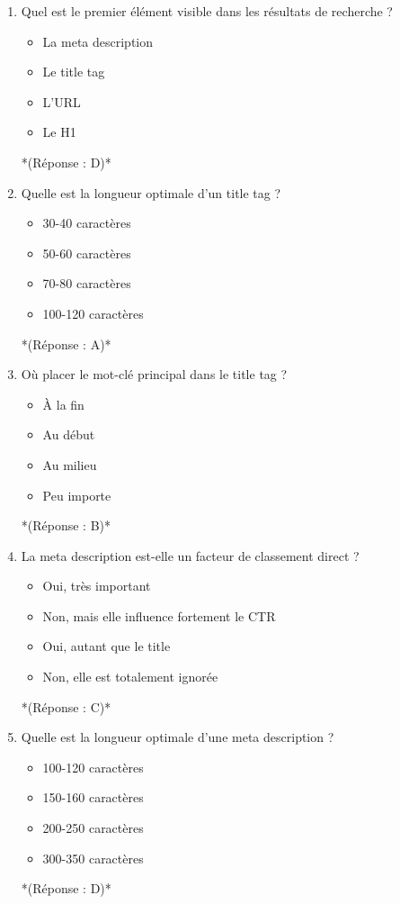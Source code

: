 \documentclass[12pt,a4paper,twoside]{report}
\begin{document}
\begin{enumerate}
\item Quel est le premier élément visible dans les résultats de recherche ?
\begin{itemize}
\item[A)] La meta description
\item[B)] Le title tag
\item[C)] L'URL
\item[D)] Le H1
\end{itemize}
*(Réponse : D)*

\item Quelle est la longueur optimale d'un title tag ?
\begin{itemize}
\item[A)] 30-40 caractères
\item[B)] 50-60 caractères
\item[C)] 70-80 caractères
\item[D)] 100-120 caractères
\end{itemize}
*(Réponse : A)*

\item Où placer le mot-clé principal dans le title tag ?
\begin{itemize}
\item[A)] À la fin
\item[B)] Au début
\item[C)] Au milieu
\item[D)] Peu importe
\end{itemize}
*(Réponse : B)*

\item La meta description est-elle un facteur de classement direct ?
\begin{itemize}
\item[A)] Oui, très important
\item[B)] Non, mais elle influence fortement le CTR
\item[C)] Oui, autant que le title
\item[D)] Non, elle est totalement ignorée
\end{itemize}
*(Réponse : C)*

\item Quelle est la longueur optimale d'une meta description ?
\begin{itemize}
\item[A)] 100-120 caractères
\item[B)] 150-160 caractères
\item[C)] 200-250 caractères
\item[D)] 300-350 caractères
\end{itemize}
*(Réponse : D)*


\end{enumerate}
\end{document}

